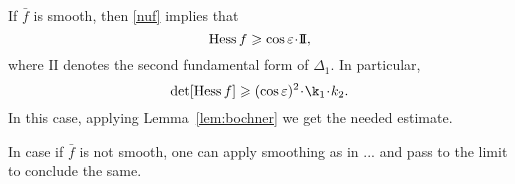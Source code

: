 If $\bar f$ is smooth, then \ref{nuf} implies that 
\[\Hess f\ge \cos\eps\cdot \mathrm{I\!I},\]
where $\mathrm{I\!I}$ denotes the second fundamental form of $\Delta_1$.
In particular,
\[\det[\Hess f]\ge (\cos\eps)^2\cdot\k_1\cdot k_2.\]
In this case, applying Lemma~\ref{lem:bochner} we get the needed estimate.

In case if $\bar f$ is not smooth, one can apply smoothing as in ... and pass to the limit to conclude the same.\qeds